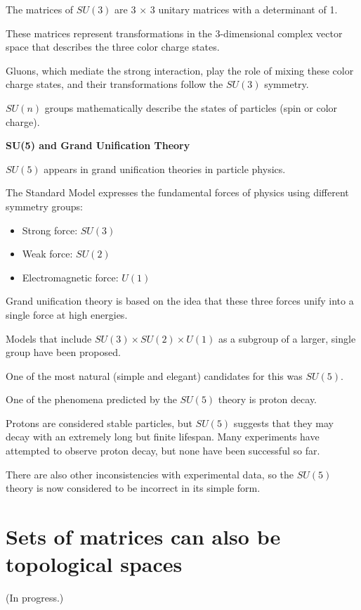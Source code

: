 \documentclass[uplatex,a4j,12pt,dvipdfmx]{jsarticle}
\begin{document}
The matrices of $SU(3)$ are 3 $\times$ 3 unitary matrices with a determinant of 1.

These matrices represent transformations in the 3-dimensional complex vector space that describes the three color charge states.

Gluons, which mediate the strong interaction, play the role of mixing these color charge states, and their transformations follow the $SU(3)$ symmetry.

$SU(n)$ groups mathematically describe the states of particles (spin or color charge).

{}

\textbf{SU(5) and Grand Unification Theory}

$SU(5)$ appears in grand unification theories in particle physics.

The Standard Model expresses the fundamental forces of physics using different symmetry groups:
\begin{itemize}
	\item Strong force: $SU(3)$
	\item Weak force: $SU(2)$
	\item Electromagnetic force: $U(1)$
\end{itemize}

Grand unification theory is based on the idea that these three forces unify into a single force at high energies.

Models that include $SU(3) \times SU(2) \times U(1)$ as a subgroup of a larger, single group have been proposed.

One of the most natural (simple and elegant) candidates for this was $SU(5)$.

One of the phenomena predicted by the $SU(5)$ theory is proton decay.

Protons are considered stable particles, but $SU(5)$ suggests that they may decay with an extremely long but finite lifespan.
Many experiments have attempted to observe proton decay, but none have been successful so far.

There are also other inconsistencies with experimental data, so the $SU(5)$ theory is now considered to be incorrect in its simple form.


\section{Sets of matrices can also be topological spaces}

(In progress.)
\end{document}
